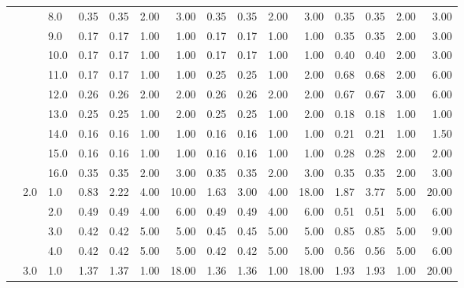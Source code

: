 \begin{tabular}{lllrrrrrrrrrrrr}
       &     & 8.0  &       0.35 &      0.35 & 2.00 &   3.00 &       0.35 &      0.35 &  2.00 &   3.00 &       0.35 &      0.35 &  2.00 &   3.00 \\
       &     & 9.0  &       0.17 &      0.17 & 1.00 &   1.00 &       0.17 &      0.17 &  1.00 &   1.00 &       0.35 &      0.35 &  2.00 &   3.00 \\
       &     & 10.0 &       0.17 &      0.17 & 1.00 &   1.00 &       0.17 &      0.17 &  1.00 &   1.00 &       0.40 &      0.40 &  2.00 &   3.00 \\
       &     & 11.0 &       0.17 &      0.17 & 1.00 &   1.00 &       0.25 &      0.25 &  1.00 &   2.00 &       0.68 &      0.68 &  2.00 &   6.00 \\
       &     & 12.0 &       0.26 &      0.26 & 2.00 &   2.00 &       0.26 &      0.26 &  2.00 &   2.00 &       0.67 &      0.67 &  3.00 &   6.00 \\
       &     & 13.0 &       0.25 &      0.25 & 1.00 &   2.00 &       0.25 &      0.25 &  1.00 &   2.00 &       0.18 &      0.18 &  1.00 &   1.00 \\
       &     & 14.0 &       0.16 &      0.16 & 1.00 &   1.00 &       0.16 &      0.16 &  1.00 &   1.00 &       0.21 &      0.21 &  1.00 &   1.50 \\
       &     & 15.0 &       0.16 &      0.16 & 1.00 &   1.00 &       0.16 &      0.16 &  1.00 &   1.00 &       0.28 &      0.28 &  2.00 &   2.00 \\
       &     & 16.0 &       0.35 &      0.35 & 2.00 &   3.00 &       0.35 &      0.35 &  2.00 &   3.00 &       0.35 &      0.35 &  2.00 &   3.00 \\
       & 2.0 & 1.0  &       0.83 &      2.22 & 4.00 &  10.00 &       1.63 &      3.00 &  4.00 &  18.00 &       1.87 &      3.77 &  5.00 &  20.00 \\
       &     & 2.0  &       0.49 &      0.49 & 4.00 &   6.00 &       0.49 &      0.49 &  4.00 &   6.00 &       0.51 &      0.51 &  5.00 &   6.00 \\
       &     & 3.0  &       0.42 &      0.42 & 5.00 &   5.00 &       0.45 &      0.45 &  5.00 &   5.00 &       0.85 &      0.85 &  5.00 &   9.00 \\
       &     & 4.0  &       0.42 &      0.42 & 5.00 &   5.00 &       0.42 &      0.42 &  5.00 &   5.00 &       0.56 &      0.56 &  5.00 &   6.00 \\
       & 3.0 & 1.0  &       1.37 &      1.37 & 1.00 &  18.00 &       1.36 &      1.36 &  1.00 &  18.00 &       1.93 &      1.93 &  1.00 &  20.00 \\

\end{tabular}
